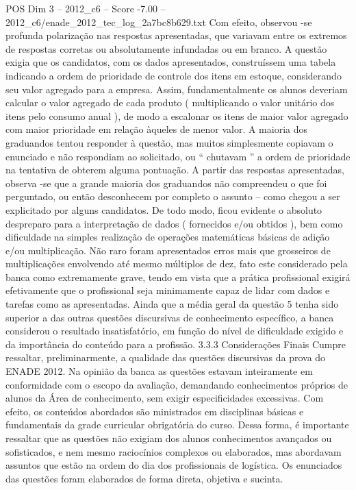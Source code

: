 \begin{textsample}{POS Dim 3 – 2012\_c6 – Score -7.00 – 2012\_c6/enade\_2012\_tec\_log\_2a7bc8b629.txt}
Com efeito, observou -se profunda polarização nas respostas apresentadas, que variavam entre os extremos de respostas corretas ou absolutamente infundadas ou em branco.
A questão exigia que os candidatos, com os dados apresentados, construíssem uma tabela indicando a ordem de prioridade de controle dos itens em estoque, considerando seu valor agregado para a empresa.
Assim, fundamentalmente os alunos deveriam calcular o valor agregado de cada produto ( multiplicando o valor unitário dos itens pelo consumo anual ), de modo a escalonar os itens de maior valor agregado com maior prioridade em relação àqueles de menor valor.
A maioria dos graduandos tentou responder à questão, mas muitos simplesmente copiavam o enunciado e não respondiam ao solicitado, ou “ chutavam ” a ordem de prioridade na tentativa de obterem alguma pontuação.
A partir das respostas apresentadas, observa -se que a grande maioria dos graduandos não compreendeu o que foi perguntado, ou então desconhecem por completo o assunto – como chegou a ser explicitado por alguns candidatos.
De todo modo, ficou evidente o absoluto despreparo para a interpretação de dados ( fornecidos e/ou obtidos ), bem como dificuldade na simples realização de operações matemáticas básicas de adição e/ou multiplicação.
Não raro foram apresentados erros mais que grosseiros de multiplicações envolvendo até mesmo múltiplos de dez, fato este considerado pela banca como extremamente grave, tendo em vista que a prática profissional exigirá efetivamente que o profissional seja minimamente capaz de lidar com dados e tarefas como as apresentadas.
Ainda que a média geral da questão 5 tenha sido superior a das outras questões discursivas de conhecimento específico, a banca considerou o resultado insatisfatório, em função do nível de dificuldade exigido e da importância do conteúdo para a profissão. 3.3.3 Considerações Finais Cumpre ressaltar, preliminarmente, a qualidade das questões discursivas da prova do ENADE 2012.
Na opinião da banca as questões estavam inteiramente em conformidade com o escopo da avaliação, demandando conhecimentos próprios de alunos da Área de conhecimento, sem exigir especificidades excessivas.
Com efeito, os conteúdos abordados são ministrados em disciplinas básicas e fundamentais da grade curricular obrigatória do curso.
Dessa forma, é importante ressaltar que as questões não exigiam dos alunos conhecimentos avançados ou sofisticados, e nem mesmo raciocínios complexos ou elaborados, mas abordavam assuntos que estão na ordem do dia dos profissionais de logística.
Os enunciados das questões foram elaborados de forma direta, objetiva e sucinta.

\end{textsample}
